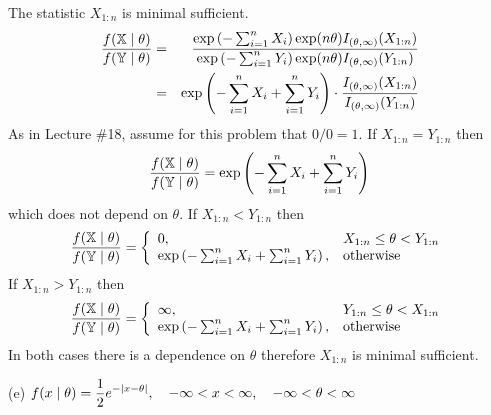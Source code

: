 \bigskip
\noindent
The statistic $X_{1:n}$ is minimal sufficient.
\begin{eqnarray*}
{f(\mathbb X\mid\theta)\over f(\mathbb Y\mid\theta)}
&=&{
\exp\left(-\sum_{i=1}^nX_i\right)
\exp(n\theta)I_{(\theta,\infty)}(X_{1:n})
\over
\exp\left(-\sum_{i=1}^nY_i\right)
\exp(n\theta)I_{(\theta,\infty)}(Y_{1:n})
}\\
&=&\exp\left(-\sum_{i=1}^nX_i+\sum_{i=1}^nY_i\right)
\cdot
{I_{(\theta,\infty)}(X_{1:n})\over I_{(\theta,\infty)}(Y_{1:n})}
\end{eqnarray*}
As in Lecture \#18, assume for this problem that $0/0=1$.
If $X_{1:n}=Y_{1:n}$ then
$${f(\mathbb X\mid\theta)\over f(\mathbb Y\mid\theta)}
=\exp\left(-\sum_{i=1}^nX_i+\sum_{i=1}^nY_i\right)$$
which does not depend on $\theta$.
%
%
%
If $X_{1:n}<Y_{1:n}$ then
$${f(\mathbb X\mid\theta)\over f(\mathbb Y\mid\theta)}
=\left\{
\begin{array}{ll}
0, & X_{1:n}\le\theta<Y_{1:n}\\
\exp\left(-\sum_{i=1}^nX_i+\sum_{i=1}^nY_i\right), & {\rm otherwise}
\end{array}\right.
$$
%
%
%
If $X_{1:n}>Y_{1:n}$ then
$${f(\mathbb X\mid\theta)\over f(\mathbb Y\mid\theta)}
=\left\{
\begin{array}{ll}
\infty, & Y_{1:n}\le\theta<X_{1:n}\\
\exp\left(-\sum_{i=1}^nX_i+\sum_{i=1}^nY_i\right), & {\rm otherwise}
\end{array}\right.
$$
In both cases there is a dependence on $\theta$ therefore
$X_{1:n}$ is minimal sufficient.

\bigskip
\noindent
(e) $\displaystyle{f(x\mid\theta)=
{1\over2}e^{-|x-\theta|},\quad
-\infty<x<\infty,\quad
-\infty<\theta<\infty}$

